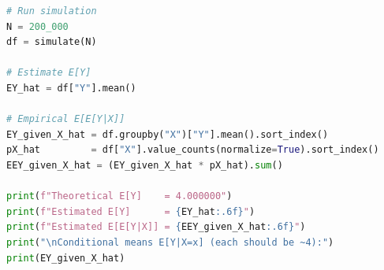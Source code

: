 \begin{example}
\begin{lstlisting}[language=Python]
# Run simulation
N = 200_000
df = simulate(N)

# Estimate E[Y]
EY_hat = df["Y"].mean()

# Empirical E[E[Y|X]]
EY_given_X_hat = df.groupby("X")["Y"].mean().sort_index()
pX_hat         = df["X"].value_counts(normalize=True).sort_index()
EEY_given_X_hat = (EY_given_X_hat * pX_hat).sum()

print(f"Theoretical E[Y]    = 4.000000")
print(f"Estimated E[Y]      = {EY_hat:.6f}")
print(f"Estimated E[E[Y|X]] = {EEY_given_X_hat:.6f}")
print("\nConditional means E[Y|X=x] (each should be ~4):")
print(EY_given_X_hat)
\end{lstlisting}

\end{example}



 
